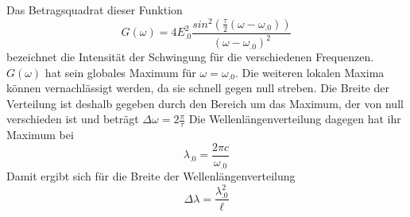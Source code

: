 Das Betragsquadrat dieser Funktion
\begin{equation*}
G(\omega)=4E^2_.0\frac{sin^2(\frac{\tau}{2}(\omega-\omega_.0))}{(\omega-\omega_.0)^2}
\end{equation*}
bezeichnet die Intensität der Schwingung für die verschiedenen Frequenzen.
$G(\omega)$ hat sein globales Maximum für $\omega =\omega_.0$. Die weiteren lokalen Maxima können vernachlässigt werden, da sie schnell gegen null streben.
Die Breite der Verteilung ist deshalb gegeben durch den Bereich um das Maximum, der von null verschieden ist und beträgt
$\Delta\omega=2\frac{\pi}{\tau}$
Die Wellenlängenverteilung dagegen hat ihr Maximum bei 
\[
\lambda_.0=\frac{2\pi c}{\omega_.0}
\]
Damit ergibt sich für die Breite der Wellenlängenverteilung
\begin{equation}
\Delta\lambda=\frac{\lambda^2_.0}{\ell}\label{eq:dl}
\end{equation}